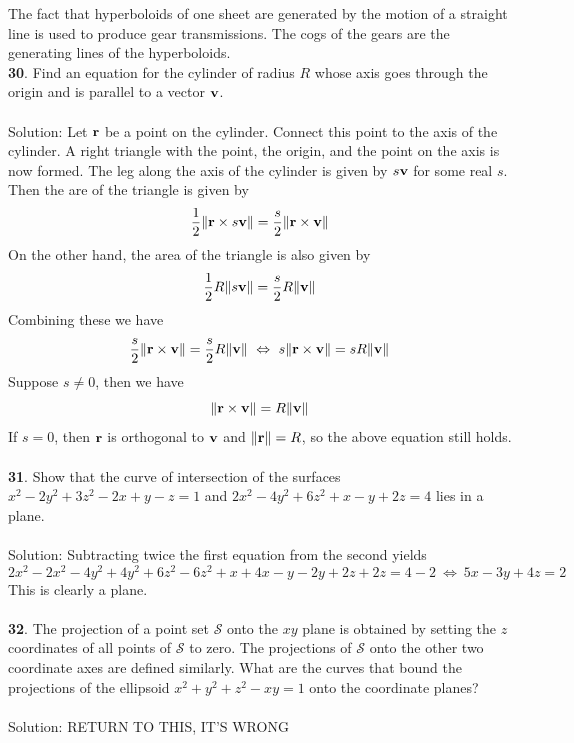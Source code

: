 \documentclass[12pt]{amsbook}
\let\cal\mathcal
\newenvironment{remark}{\vspace*{6pt}\noindent{\bf Remark.}}{} %
\begin{document}
\begin{remark} The fact that hyperboloids of one sheet are generated
by the motion of a straight line is used to produce gear
transmissions. The cogs of the gears are the generating lines of
the hyperboloids. 
\end{remark}\\[-5pt]

\noindent
{\small\bf 30}.  Find an equation for the cylinder of radius $R$ whose
axis goes through the origin and is parallel to a vector ${\bf
v}$.\\
\\
{\sc Solution}: Let $\bf r$ be a point on the cylinder. Connect this point to the axis of the cylinder. A right triangle with the point, the origin, and the point on the axis is now formed. The leg along the axis of the cylinder is given by $s{\bf v}$ for some real $s$. Then the are of the triangle is given by
$$\frac{1}{2}\|{\bf r}\times s{\bf v}\|=\frac{s}{2}\|{\bf r}\times {\bf v}\|$$
On the other hand, the area of the triangle is also given by
$$\frac{1}{2}R\|s{\bf v}\|=\frac{s}{2}R\|{\bf v}\|$$
Combining these we have
$$\frac{s}{2}\|{\bf r}\times {\bf v}\|=\frac{s}{2}R\|{\bf v}\| \ \Leftrightarrow	 \ s\|{\bf r}\times {\bf v}\|=sR\|{\bf v}\|$$
Suppose $s\neq 0$, then we have
$$\|{\bf r}\times {\bf v}\|=R\|{\bf v}\|$$
If $s=0$, then ${\bf r}$ is orthogonal to ${\bf v}$ and $\|{\bf r}\|=R$, so the above equation still holds.
\\
\\
{\small\bf 31}.  Show that the curve of intersection of the surfaces
$x^2-2y^2+3z^2-2x +y-z=1$ and $2x^2-4y^2+6z^2+x-y+2z=4$ lies in a
plane.\\
\\
{\sc Solution}: Subtracting twice the first equation from the second yields
$$2x^2-2x^2-4y^2+4y^2+6z^2-6z^2+x+4x-y-2y+2z+2z=4-2 \ \Leftrightarrow \ 5x-3y+4z=2$$
This is clearly a plane.
\\
\\ 
{\small\bf 32}.  The projection of a point set ${\cal S}$ 
onto the $xy$ plane is obtained by setting the $z$ coordinates
of all points of ${\cal S}$ to zero. The 
projections of ${\cal S}$ onto the other two coordinate axes are
defined similarly.  
What are the curves that bound the projections
of the ellipsoid $x^2+y^2+z^2-xy=1$ onto the coordinate 
planes?
\\
\\
{\sc Solution}: 
RETURN TO THIS, IT'S WRONG
\\
\\
\end{document}
